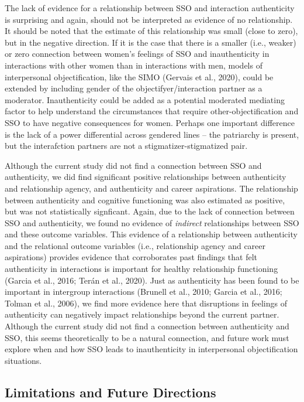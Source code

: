 \documentclass[man]{apa6}
\begin{document}
The lack of evidence for a relationship between SSO and interaction
authenticity is surprising and again, should not be interpreted as
evidence of no relationship. It should be noted that the estimate of
this relationship was small (close to zero), but in the negative
direction. If it is the case that there is a smaller (i.e., weaker) or
zero connection between women's feelings of SSO and inauthenticity in
interactions with other women than in interactions with men, models of
interpersonal objectification, like the SIMO (Gervais et al., 2020),
could be extended by including gender of the objectifyer/interaction
partner as a moderator. Inauthenticity could be added as a potential
moderated mediating factor to help understand the circumstances that
require other-objectification and SSO to have negative consequences for
women. Perhaps one important difference is the lack of a power
differential across gendered lines -- the patriarchy is present, but the
interafction partners are not a stigmatizer-stigmatized pair.

Although the current study did not find a connection between SSO and
authenticity, we did find significant positive relationships between
authenticity and relationship agency, and authenticity and career
aspirations. The relationship between authenticity and cognitive
functioning was also estimated as positive, but was not statistically
signficant. Again, due to the lack of connection between SSO and
authenticity, we found no evidence of \emph{indirect} relationships
between SSO and these outcome variables. This evidence of a relationship
between authenticity and the relational outcome variables (i.e.,
relationship agency and career aspirations) provides evidence that
corroborates past findings that felt authenticity in interactions is
important for healthy relationship functioning (Garcia et al., 2016;
Terán et al., 2020). Just as authenticity has been found to be important
in intergroup interactions (Brunell et al., 2010; Garcia et al., 2016;
Tolman et al., 2006), we find more evidence here that disruptions in
feelings of authenticity can negatively impact relationships beyond the
current partner. Although the current study did not find a connection
between authenticity and SSO, this seems theoretically to be a natural
connection, and future work must explore when and how SSO leads to
inauthenticity in interpersonal objectification situations.

\subsection{Limitations and Future
Directions}\label{limitations-and-future-directions}
\end{document}
